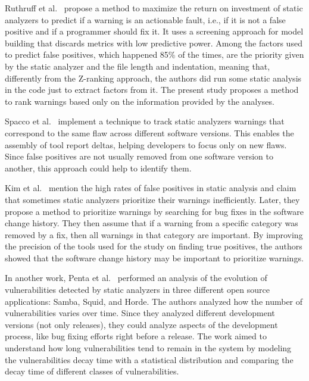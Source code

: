 Ruthruff et al.~\cite{ruthruff_predicting_2008} propose a method to maximize
the return on investment of static analyzers to predict if a warning is an
actionable fault, i.e., if it is not a false positive and if a programmer
should fix it. It uses a screening approach for model building that discards
metrics with low predictive power. Among the factors used to predict false
positives, which happened 85\% of the times, are the priority given by the
static analyzer and the file length and indentation, meaning that, differently
from the Z-ranking approach, the authors did run some static analysis in the
code just to extract factors from it. The present study proposes a method to
rank warnings based only on the information provided by the analyses.

Spacco et al.~\cite{spacco_tracking_2006} implement a technique
to track static analyzers warnings that correspond to the same flaw across
different software versions. This enables the assembly of tool report
deltas, helping developers to focus only on new flaws. Since false positives
are not usually removed from one software version to another, this approach
could help to identify them.

Kim et al.~\cite{kim_which_2007} mention the high rates of false positives in
static analysis and claim that sometimes static analyzers prioritize their
warnings inefficiently. Later, they propose a method to prioritize
warnings by searching for bug fixes in the software change history. They then
assume that if a warning from a specific category was removed by a fix, then
all warnings in that category are important. By improving the precision of the
tools used for the study on finding true positives, the authors showed that the
software change history may be important to prioritize warnings.

In another work, Penta et al.~\cite{penta_evolution_2008} performed an analysis
of the evolution of vulnerabilities detected by static analyzers in three
different open source applications: Samba, Squid, and Horde. The authors
analyzed how the number of vulnerabilities varies over time. Since they
analyzed different development versions (not only releases), they could analyze
aspects of the development process, like bug fixing efforts right before a
release. The work aimed to understand how long vulnerabilities tend
to remain in the system by modeling the vulnerabilities decay time with a
statistical distribution and comparing the decay time of different classes of
vulnerabilities.

